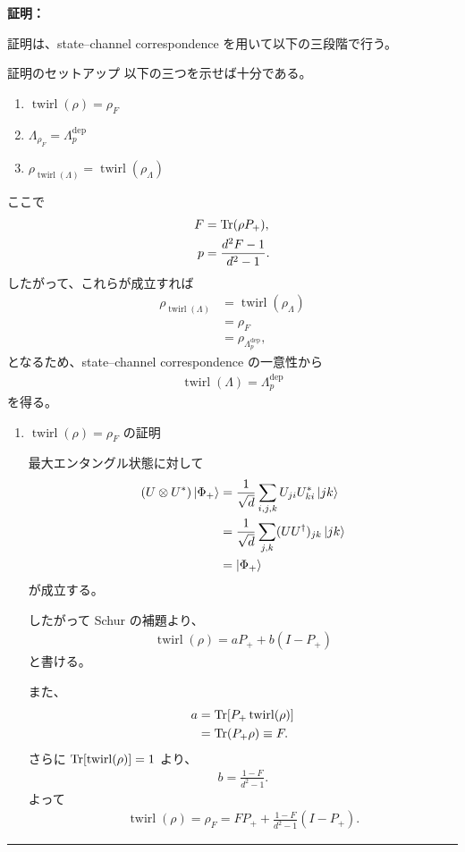 \documentclass[a4paper,10.5pt]{article}
\numberwithin{equation}{section}
\newenvironment{proofbox}
{\begin{prooflabel}\textbf{証明：}\end{prooflabel}\vspace{0.8em}}
{\par\vspace{1em}\hrule\vspace{1em}}
\begin{document}
\begin{proofbox}
証明は、state--channel correspondence を用いて以下の三段階で行う。

\begin{setupbox}{証明のセットアップ}
以下の三つを示せば十分である。
\begin{enumerate}
    \item $\operatorname{twirl}(\rho)=\rho_F$
    \item $\Lambda_{\rho_F}=\Lambda_p^{\mathrm{dep}}$
    \item $\rho_{\operatorname{twirl}(\Lambda)}
    =\operatorname{twirl}(\rho_\Lambda)$
\end{enumerate}
ここで
\begin{align*}
    F&=\Tr(\rho P_+),\\
    p&=\frac{d^2F-1}{d^2-1}.
\end{align*}
したがって、これらが成立すれば
\begin{align*}
    \rho_{\operatorname{twirl}(\Lambda)}
    &=
    \operatorname{twirl}(\rho_\Lambda)\\
    &=
    \rho_F\\
    &=
    \rho_{\Lambda_p^{\mathrm{dep}}},
\end{align*}
となるため、state--channel correspondence の一意性から
\begin{align*}
    \operatorname{twirl}(\Lambda)
    =
    \Lambda_p^{\mathrm{dep}}
\end{align*}
を得る。
\end{setupbox}

\begin{enumerate}
\item $\operatorname{twirl}(\rho)=\rho_F$ の証明

最大エンタングル状態に対して
\begin{align*}
    (U\otimes U^*)\ket{\Phi_+}
    &=
    \frac{1}{\sqrt{d}}
    \sum_{i,j,k}
    U_{ji}U_{ki}^*\ket{jk}\\
    &=
    \frac{1}{\sqrt{d}}
    \sum_{j,k}(UU^\dagger)_{jk}\ket{jk}\\
    &=
    \ket{\Phi_+}
\end{align*}
が成立する。

したがって Schur の補題より、
\begin{align*}
    \operatorname{twirl}(\rho)
    =
    aP_+ + b(I-P_+)
\end{align*}
と書ける。

また、
\begin{align*}
    a
    &=
    \Tr[P_+\operatorname{twirl}(\rho)]\\
    &=
    \Tr(P_+\rho)
    \equiv F.
\end{align*}
さらに $\Tr[\operatorname{twirl}(\rho)]=1$ より、
\begin{align*}
    b=\frac{1-F}{d^2-1}.
\end{align*}
よって
\begin{align*}
    \boxed{
    \operatorname{twirl}(\rho)
    =
    \rho_F
    =
    FP_+
    +
    \frac{1-F}{d^2-1}(I-P_+)
    }.
\end{align*}


\end{enumerate}
\end{proofbox}
\end{document}
